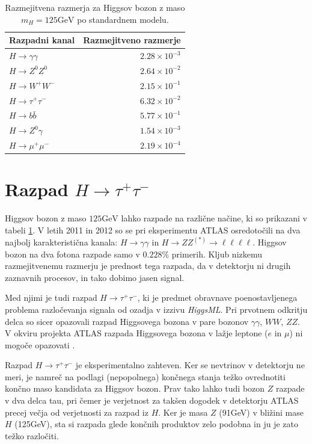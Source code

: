\documentclass[11pt,a4paper,openany]{book}
\begin{document}
\begin{table}[ht]
	\centering
	\begin{tabular}{lr}
		\hline
		\textbf{Razpadni kanal} & \textbf{Razmejitveno razmerje} \\
		\hline
		$H \rightarrow \gamma\gamma$ & $\num{2,28} \times 10^{-3}$ \\	
		$H \rightarrow Z^0Z^0$ & $\num{2,64} \times 10^{-2}$ \\
		$H \rightarrow W^+W^-$ & $\num{2,15} \times 10^{-1}$ \\
		$H \rightarrow \tau^+\tau^-$ & $\num{6,32} \times 10^{-2}$ \\
		$H \rightarrow b\bar{b}$ & $\num{5,77} \times 10^{-1}$ \\
		$H \rightarrow Z^0\gamma$ & $\num{1,54} \times 10^{-3}$ \\
		$H \rightarrow \mu^+\mu^-$ & $\num{2,19} \times 10^{-4}$
	\end{tabular}
	\caption{Razmejitvena razmerja za Higgsov bozon z maso $m_H = 125\text{GeV}$ po standardnem modelu\cite{PDGHiggs}.}
	\label{tb:pdghiggs}
\end{table}
 

\section{Razpad $H \rightarrow \tau^+\tau^-$}

Higgsov bozon z maso $125\text{GeV}$ lahko razpade na različne načine, ki so prikazani v tabeli \ref{tb:pdghiggs}. V letih 2011 in 2012 so se pri eksperimentu ATLAS osredotočili na dva najbolj karakteristična kanala: $H \rightarrow \gamma\gamma$ in $H \rightarrow ZZ^{(*)} \rightarrow \ell\ell\ell\ell$. Higgsov bozon na dva fotona razpade samo v $\num{0,228}\%$ primerih. Kljub nizkemu razmejitvenemu razmerju je prednost tega razpada, da v detektorju ni drugih zaznavnih procesov, in tako dobimo jasen signal.

Med njimi je tudi razpad $H \rightarrow \tau^+\tau^-$, ki je predmet obravnave poenostavljenega problema razločevanja signala od ozadja v izzivu \textit{HiggsML}. Pri prvotnem odkritju delca so sicer opazovali razpad Higgsovega bozona v pare bozonov $\gamma\gamma$, $WW$, $ZZ$. V okviru projekta ATLAS razpada Higgsovega bozona v lažje leptone ($e$ in $\mu$) ni mogoče opazovati \cite{ChallengeDoc}.

Razpad $H \rightarrow \tau^+\tau^-$ je eksperimentalno zahteven. Ker se nevtrinov v detektorju ne meri, je namreč na podlagi (nepopolnega) končnega stanja težko ovrednotiti končno maso kandidata za Higgsov bozon. Prav tako lahko tudi bozon $Z$ razpade v dva delca tau, pri čemer je verjetnost za takšen dogodek v detektorju ATLAS precej večja od verjetnosti za razpad iz $H$. Ker je masa $Z$ (91GeV) v bližini mase $H$ (125GeV), sta si razpada glede končnih produktov zelo podobna in ju je zato težko razločiti.
\end{document}
